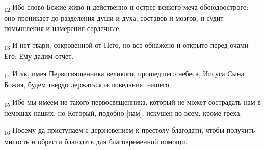 \begin{tcolorbox}
\textsubscript{12} Ибо слово Божие живо и действенно и острее всякого меча обоюдоострого: оно проникает до разделения души и духа, составов и мозгов, и судит помышления и намерения сердечные.
\end{tcolorbox}
\begin{tcolorbox}
\textsubscript{13} И нет твари, сокровенной от Него, но все обнажено и открыто перед очами Его: Ему дадим отчет.
\end{tcolorbox}
\begin{tcolorbox}
\textsubscript{14} Итак, имея Первосвященника великого, прошедшего небеса, Иисуса Сына Божия, будем твердо держаться исповедания [нашего].
\end{tcolorbox}
\begin{tcolorbox}
\textsubscript{15} Ибо мы имеем не такого первосвященника, который не может сострадать нам в немощах наших, но Который, подобно [нам], искушен во всем, кроме греха.
\end{tcolorbox}
\begin{tcolorbox}
\textsubscript{16} Посему да приступаем с дерзновением к престолу благодати, чтобы получить милость и обрести благодать для благовременной помощи.
\end{tcolorbox}
